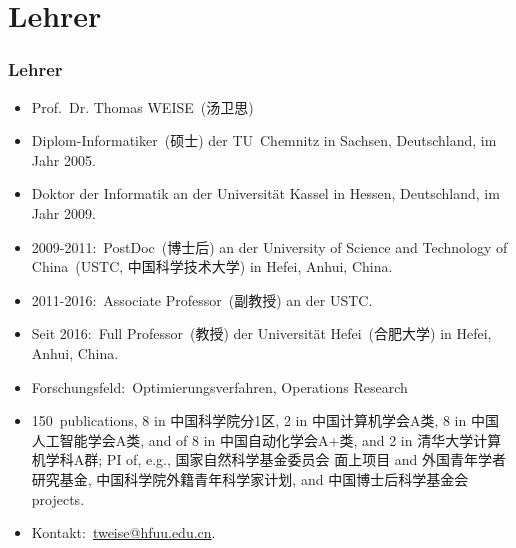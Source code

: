 \documentclass[aspectratio=169,mathserif,notheorems]{beamer}%
\begin{document}
\section{Lehrer}%
%
\begin{frame}[t]%
\frametitle{Lehrer}%
\begin{itemize}%
%
\item Prof.~Dr. Thomas WEISE~(汤卫思)%
%
\item<2-> Diplom-Informatiker~(硕士) der TU~Chemnitz in Sachsen, Deutschland, im Jahr 2005.%
%
\item<15-> Doktor der Informatik an der Universität Kassel in Hessen, Deutschland, im Jahr 2009.
%
\item<25-> 2009-2011:~PostDoc~(博士后) an der University of Science and Technology of China~(USTC, 中国科学技术大学) in Hefei, Anhui, China.%
%
\item<38-> 2011-2016:~Associate Professor~(副教授) an der USTC.%
%
\item<39-> Seit 2016:~Full Professor~(教授) der Universität Hefei~(合肥大学) in Hefei, Anhui, China.%
%
\item<40-> Forschungsfeld:~Optimierungsverfahren, Operations Research%
%
\item<41-> 150~publications, 8 in 中国科学院分1区, 2 in 中国计算机学会A类, 8 in 中国人工智能学会A类, and of 8 in 中国自动化学会A+类, and 2 in 清华大学计算机学科A群; PI of, e.g., 国家自然科学基金委员会 面上项目 and 外国青年学者研究基金, 中国科学院外籍青年科学家计划, and 中国博士后科学基金会 projects.%
%
\item<42-> Kontakt:~\href{mailto:tweise@hfuu.edu.cn}{tweise@hfuu.edu.cn}.%
%
\end{itemize}%
%
%
%
%
%
%

\end{frame}
\end{document}
